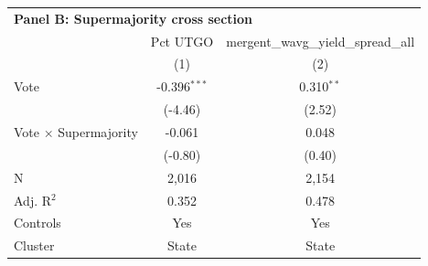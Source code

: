 \begingroup
\centering
\begin{tabular*}{\textwidth}{@{\extracolsep{\fill}}lcc}
\multicolumn{3}{l}{\textbf{Panel B: Supermajority cross section}}\\

\addlinespace
   \toprule
                                & Pct UTGO       & mergent\_wavg\_yield\_spread\_all\\      
                                & (1)            & (2)\\  
   \midrule 
   Vote                         & -0.396$^{***}$ & 0.310$^{**}$\\   
                                & (-4.46)       & (2.52)\\   
   Vote $\times$ Supermajority  & -0.061         & 0.048\\   
                                & (-0.80)       & (0.40)\\   
   \hline
   N                 & 2,016          & 2,154\\  
   Adj. R$^2$               & 0.352          & 0.478\\  
   Controls                   & Yes            & Yes\\
   Cluster              & State & State\\  
   \bottomrule
\end{tabular*}
\par\endgroup
